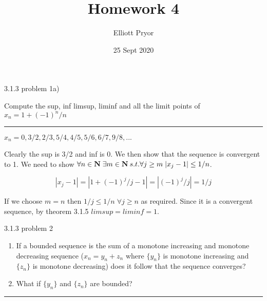 \documentclass[11pt]{article}
\title{Homework 4}
\author{Elliott Pryor}
\date{25 Sept 2020}
\begin{document}
\maketitle



 3.1.3 problem 1a)

Compute the sup, inf limsup, liminf and all the limit points of $x_n = 1 + (-1)^n / n$

\hrule


$x_n = 0, 3/2, 2/3, 5/4, 4/5, 5/6, 6/7, 9/8, ...$

Clearly the sup is 3/2 and inf is 0. 
We then show that the sequence is convergent to 1.
We need to show $\forall n \in \mathbf{N} \; \exists m \in \mathbf{N} \: s.t. \forall j \geq m \; |x_j - 1| \leq 1/n$. 

$$|x_j - 1| = |1 + (-1)^j / j -1| = |(-1)^j/j| = 1/j$$

If we choose $m = n$ then $1/j \leq 1/n \; \forall j \geq n$ as required. Since it is a convergent sequence, by theorem 3.1.5 $limsup = liminf = 1$.



\newpage
{} 3.1.3 problem 2

\begin{enumerate}
 \item If a bounded sequence is the sum of a monotone increasing and monotone decreasing sequence ($x_n = y_n + z_n$ where $\{y_n\}$ is monotone increasing and $\{z_n\}$ is monotone decreasing) does it follow that the sequence converges? 
 
 \item What if $\{y_n\}$ and $\{z_n\}$ are bounded?
\end{enumerate}

\hrule
\end{document}
